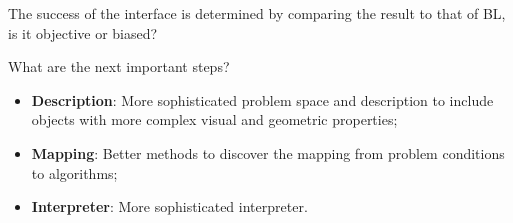 \documentclass[10pt]{beamer}
\begin{document}
\begin{frame}

\begin{alertblock}{The success of the interface is determined by comparing the result to that of BL, is it objective or biased?}
\end{alertblock}

\end{frame}

\begin{frame}

\begin{alertblock}{What are the next important steps?}
\begin{itemize}
\item \textbf{Description}: More sophisticated problem space and description to include objects with more complex visual and geometric properties;
\item \textbf{Mapping}: Better methods to discover the mapping from problem conditions to algorithms;
\item \textbf{Interpreter}: More sophisticated interpreter.
\end{itemize}
\end{alertblock}

\end{frame}
\end{document}
